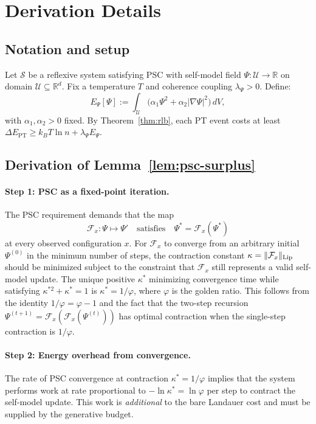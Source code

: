 \documentclass[11pt,twocolumn]{article}
\theoremstyle{remark}
\begin{document}
\appendix

\section{Derivation Details}
\label{app:derivation}

\subsection{Notation and setup}
\label{app:derivation:setup}

Let $\mathcal{S}$ be a reflexive system satisfying PSC with self-model
field $\Psi : \mathcal{U} \to \mathbb{R}$ on domain $\mathcal{U}
\subseteq \mathbb{R}^d$. Fix a temperature $T$ and coherence coupling
$\lambda_\Psi > 0$. Define:
\[
  E_\Psi[\Psi] := \int_\mathcal{U}
  \bigl(\alpha_1 \Psi^2 + \alpha_2 |\nabla\Psi|^2\bigr)\,dV,
\]
with $\alpha_1, \alpha_2 > 0$ fixed. By Theorem~\ref{thm:rlb}, each PT
event costs at least $\Delta E_{\mathrm{PT}} \geq k_B T \ln n +
\lambda_\Psi E_\Psi$.

\subsection{Derivation of Lemma~\ref{lem:psc-surplus}}
\label{app:derivation:psc}

\paragraph{Step 1: PSC as a fixed-point iteration.}
The PSC requirement demands that the map
\[
  \mathcal{F}_x : \Psi \mapsto \Psi' \quad \text{satisfies} \quad
  \Psi^* = \mathcal{F}_x(\Psi^*)
\]
at every observed configuration $x$. For $\mathcal{F}_x$ to converge
from an arbitrary initial $\Psi^{(0)}$ in the minimum number of steps,
the contraction constant $\kappa = \|\mathcal{F}_x\|_{\rm Lip}$ should
be minimized subject to the constraint that $\mathcal{F}_x$ still
represents a valid self-model update. The unique positive $\kappa^*$
minimizing convergence time while satisfying $\kappa^{*2} + \kappa^* = 1$
is $\kappa^* = 1/\varphi$, where $\varphi$ is the golden ratio. This
follows from the identity $1/\varphi = \varphi - 1$ and the fact that
the two-step recursion $\Psi^{(t+1)} = \mathcal{F}_x(\mathcal{F}_x(\Psi^{(t)}))$
has optimal contraction when the single-step contraction is $1/\varphi$.

\paragraph{Step 2: Energy overhead from convergence.}
The rate of PSC convergence at contraction $\kappa^* = 1/\varphi$
implies that the system performs work at rate proportional to
$-\ln\kappa^* = \ln\varphi$ per step to contract the self-model
update. This work is \emph{additional} to the bare Landauer cost
and must be supplied by the generative budget.
\end{document}
